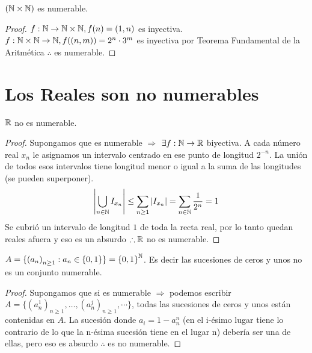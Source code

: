 \begin{eg}
    \((\mathbb{N} \times \mathbb{N})\) es numerable.
    \begin{proof}
        \(f: \mathbb{N} \to \mathbb{N}\times \mathbb{N}, f(n)=(1, n)\) es inyectiva.
        \(f: \mathbb{N}\times \mathbb{N} \to \mathbb{N} , f((n, m))= 2^n \cdot 3^m\) es inyectiva por Teorema Fundamental de la Aritmética \(\therefore \) es numerable.
    \end{proof}
\end{eg}

\section{Los Reales son no numerables}

\begin{theorem}
    \(\mathbb{R} \)  no es numerable.
    \begin{proof}
        Supongamos que es numerable \(\Rightarrow \)
        \(\exists f: \mathbb{N} \to \mathbb{R} \) biyectiva. A cada número real \(x_n\) le asignamos un intervalo centrado en ese punto de longitud \(2^{-n} \). La unión de todos esos intervalos tiene longitud menor o igual a la suma de las longitudes (se pueden superponer).
        \begin{align*}
            \left|\bigcup_{n \in \mathbb{N}} I_{x_n}\right| \leq \sum_{n \geq 1} |I_{x_n}| = \sum_{n \in \mathbb{N}}\dfrac{1}{2^n} = 1
        \end{align*}
        Se cubrió un intervalo de longitud \(1\) de toda la recta real, por lo tanto quedan reales afuera y eso es un absurdo \(\therefore \mathbb{R} \) no es numerable.
    \end{proof}
\end{theorem}

\begin{eg}
    \(A = \{ {(a_n)}_{n \geq 1} : a_n \in \{0, 1\} \} = {\{0, 1\}}^{\mathbb{N}} \). Es decir las sucesiones de ceros y unos no es un conjunto numerable.
    \begin{proof}
        Supongamos que si es numerable \(\Rightarrow \) podemos escribir \\ \(A = \{ {(a_n^1)}_{n\geq1}, \ldots, {(a_n^j)}_{n\geq1}, \cdots \} \), todas las sucesiones de ceros y unos están contenidas en \(A\). La sucesión donde \(a_i=1-a_n^n\) (en el i-ésimo lugar tiene lo contrario de lo que la n-ésima sucesión tiene en el lugar n) debería ser una de ellas, pero eso es absurdo \(\therefore \) es no numerable.
    \end{proof}
\end{eg}

